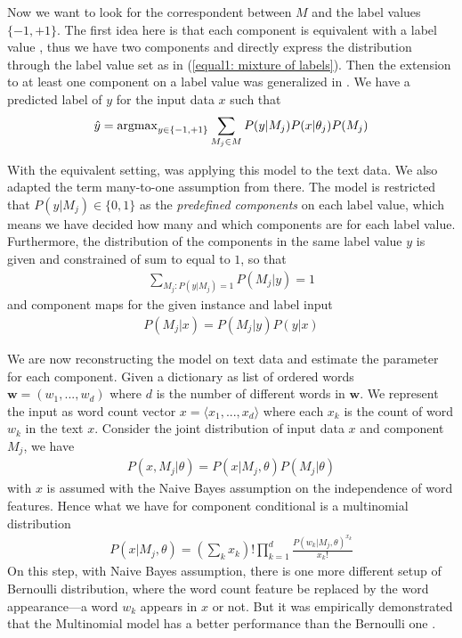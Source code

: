 Now we want to look for the correspondent between $M$ and the label values $\{-1, +1\}$. The first idea here is that each component is equivalent with a label value \parencite{10.2307/2984875}, thus we have two components and directly express the distribution through the label value set as in (\ref{equal1: mixture of labels}). Then the extension to at least one component on a label value was generalized in \parencite{NIPS1996_1208}. We have a predicted label of $y$ for the input data $x$ such that
\begin{align}
	\hat{y} = \operatorname{argmax}_{y \in \{-1, +1\}}{
		\sum_{M_j \in M}{P(y | M_j) P(x | \theta_j) P(M_j)}
	}
\end{align}

With the equivalent setting, \citeauthor{Nigam:2000:TCL:347709.347724} \parencite{Nigam:2000:TCL:347709.347724} was applying this model to the text data. We also adapted the term many-to-one assumption from there. The model is restricted that $P(y|M_j) \in \{0,1\}$ as the \textit{predefined components} on each label value, which means we have decided how many and which components are for each label value. Furthermore, the distribution of the components in the same label value $y$ is given and constrained of sum to equal to $1$, so that
\begin{align}
	\sum_{M_j : P(y | M_j)=1}{ P(M_j | y) } = 1
\end{align} 
and component maps for the given instance and label input
\begin{align}
	P(M_j|x) = P(M_j|y) P(y|x)
\end{align}

We are now reconstructing the model on text data and estimate the parameter for each component. Given a dictionary as list of ordered words $\textbf{w} = (w_1, ..., w_d)$ where $d$ is the number of different words in $\textbf{w}$. We represent the input as word count vector $x = \langle x_1, ...,x_d \rangle$ where each $x_k$ is the count of word $w_k$ in the text $x$. Consider the joint distribution of input data $x$ and component $M_j$, we have
\begin{align}
	P(x, M_j | \theta) = P(x | M_j, \theta) P(M_j|\theta)
\end{align}
with $x$ is assumed with the Naive Bayes assumption on the independence of word features. Hence what we have for component conditional is a multinomial distribution
\begin{align}
	P(x | M_j, \theta) = 
	(\sum_k{ x_k })! 
	\prod_{k=1}^{d}{ 
		\frac{
			P(w_k | M_j, \theta)^{x_k}
		}{
			x_k!
		}
	}
\end{align} 
On this step, with Naive Bayes assumption, there is one more different setup of Bernoulli distribution, where the word count feature be replaced by the word appearance---a word $w_k$ appears in $x$ or not. But it was empirically demonstrated that the Multinomial model has a better performance than the Bernoulli one \parencite{mccallum1998naive}.

